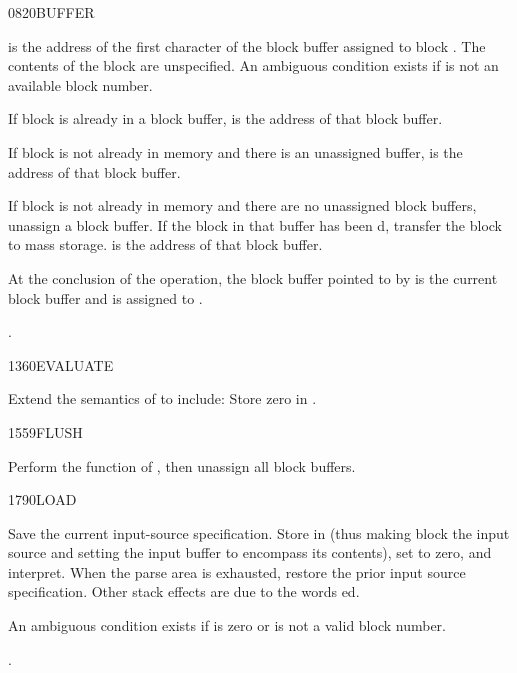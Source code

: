 \begin{worddef}{0820}{BUFFER}
\item {}

	 is the address of the first character of the
	block buffer assigned to block . The contents of the
	block are unspecified. An ambiguous condition exists if 
	is not an available block number.

	If block  is already in a block buffer, 
	is the address of that block buffer.

	If block  is not already in memory and there is an
	unassigned 	buffer,  is the address of that block
	buffer.

	If block  is not already in memory and there are no
	unassigned block buffers, unassign a block buffer. If the block
	in that buffer has been d, transfer the block to
	mass storage.  is the address of that block buffer.

	At the conclusion of the operation, the block buffer pointed to
	by  is the current block buffer and is assigned to
	.

\see {}.
\end{worddef}


\begin{worddef}{1360}{EVALUATE}
\item Extend the semantics of  to
	include: Store zero in .
\end{worddef}


\begin{worddef}{1559}{FLUSH}
\item \stack{}{}

	Perform the function of , then unassign all
	block buffers.
\end{worddef}


\begin{worddef}{1790}{LOAD}
\item {}

	Save the current input-source specification. Store  in
	 (thus making block  the input source and
	setting the input buffer to encompass its contents), set
	 to zero, and interpret. When the parse area is
	exhausted, restore the prior input source specification. Other
	stack effects are due to the words ed.

	An ambiguous condition exists if  is zero or is not a
	valid block number.

\see {}.
\end{worddef}


